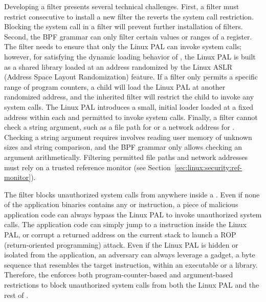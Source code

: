 Developing a \seccomp{} filter presents several technical challenges.
First, a filter must restrict consecutive \picoprocs{}
to install a new filter the reverts the system call restriction.
Blocking the  system call in a \seccomp{} filter will prevent further installation of \seccomp{} filters.
Second, the BPF grammar can only filter certain values or ranges of a register.
The filter needs to
ensure that only the Linux PAL can invoke system calls;
however,
for satisfying the dynamic loading behavior of \thehostabi{},
the Linux PAL
is built as a shared library loaded at an address randomized by the Linux ASLR (Address Space Layout Randomization) feature.
If a filter only permits a specific range of program counters,
a child \picoproc{}
will load the Linux PAL at another randomized address,
and the inherited filter will restrict the child \picoproc{} to invoke any system calls.
The Linux PAL introduces a small, initial loader
loaded at a fixed address
within each \picoproc{} and permitted to invoke system calls.
Finally, a \seccomp{} filter
cannot check a string argument, such as a file path for  or a network address for .
Checking a string argument requires
involves reading user memory of unknown sizes and string comparison, and the BPF grammar only allows checking an argument arithmetically.
Filtering permitted file paths and network addresses
must rely on a trusted reference monitor (see Section~\ref{sec:linux:security:ref-monitor}).



The \seccomp{} filter blocks  unauthorized system calls
from anywhere inside a \picoproc{}.
Even if none of the application binaries contains any  or  instruction,
a piece of malicious application code can always bypass the Linux PAL
to invoke unauthorized system calls.
The application code can simply
jump to a  instruction inside the Linux PAL,
or corrupt a returned address on the current stack to launch a ROP (return-oriented programming) attack.
Even if the Linux PAL is hidden or isolated from the application,
an adversary can always leverage a gadget, a byte sequence that resembles the target instruction, within an executable or a library.
Therefore, the \seccomp{} enforces both program-counter-based 
and argument-based restrictions
to block unauthorized system calls from both the Linux PAL and the rest of \picoproc{}.


